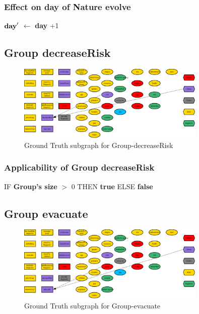\documentclass{article}%
\begin{document}
%
\subsubsection{Effect on day of Nature evolve}%
\label{ssubsec:Effect on day of Nature evolve}%
\begin{flushleft}%
$\mbox{\textbf{day}} '$%
$\leftarrow$%
\textbf{day}%
+1%
\end{flushleft}

%
\subsection{Group decreaseRisk}%
\label{subsec:Group decreaseRisk}%


\begin{figure}[ht]%
\centering%
\includegraphics[width=0.8\textwidth]{images/Group-decreaseRisk.png}%
\caption{Ground Truth subgraph for Group{-}decreaseRisk}%
\end{figure}

%
\subsubsection{Applicability of Group decreaseRisk}%
\label{ssubsec:Applicability of Group decreaseRisk}%
\begin{flushleft}%
IF %
\textbf{Group's size}%
$>$%
0%
\linebreak%
\hspace*{2em}%
THEN %
\textbf{true}%
\linebreak%
\hspace*{2em}%
ELSE %
\textbf{false}%
\end{flushleft}

%
\subsection{Group evacuate}%
\label{subsec:Group evacuate}%


\begin{figure}[ht]%
\centering%
\includegraphics[width=0.8\textwidth]{images/Group-evacuate.png}%
\caption{Ground Truth subgraph for Group{-}evacuate}%
\end{figure}
\end{document}
